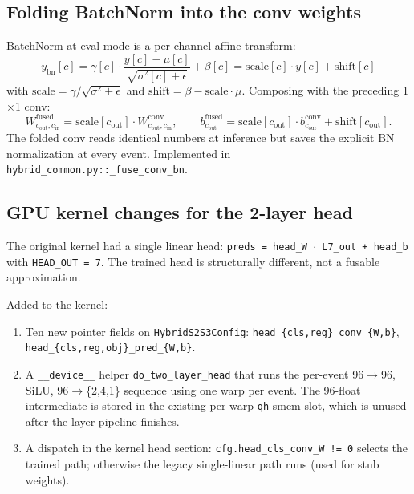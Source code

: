 \documentclass[11pt,a4paper]{article}
\begin{document}
\subsection{Folding BatchNorm into the conv weights}

BatchNorm at eval mode is a per-channel affine transform:
\[
y_{\text{bn}}[c] = \gamma[c] \cdot \frac{y[c] - \mu[c]}{\sqrt{\sigma^2[c] + \epsilon}} + \beta[c]
                  = \mathrm{scale}[c] \cdot y[c] + \mathrm{shift}[c]
\]
with $\mathrm{scale} = \gamma / \sqrt{\sigma^2 + \epsilon}$ and
$\mathrm{shift} = \beta - \mathrm{scale} \cdot \mu$. Composing with the
preceding 1$\times$1 conv:
\[
W^{\text{fused}}_{c_{\text{out}}, c_{\text{in}}} = \mathrm{scale}[c_{\text{out}}] \cdot W^{\text{conv}}_{c_{\text{out}}, c_{\text{in}}}, \qquad
b^{\text{fused}}_{c_{\text{out}}} = \mathrm{scale}[c_{\text{out}}] \cdot b^{\text{conv}}_{c_{\text{out}}} + \mathrm{shift}[c_{\text{out}}].
\]
The folded conv reads identical numbers at inference but saves
the explicit BN normalization at every event. Implemented in
\texttt{hybrid\_common.py::\_fuse\_conv\_bn}.

\subsection{GPU kernel changes for the 2-layer head}

The original kernel had a single linear head:
\texttt{preds = head\_W $\cdot$ L7\_out + head\_b} with
\texttt{HEAD\_OUT = 7}. The trained head is structurally different,
not a fusable approximation.

Added to the kernel:

\begin{enumerate}[itemsep=0pt]
  \item Ten new pointer fields on \texttt{HybridS2S3Config}:
        \texttt{head\_\{cls,reg\}\_conv\_\{W,b\}},
        \texttt{head\_\{cls,reg,obj\}\_pred\_\{W,b\}}.
  \item A \texttt{\_\_device\_\_} helper \texttt{do\_two\_layer\_head}
        that runs the per-event 96$\to$96, SiLU, 96$\to$\{2,4,1\}
        sequence using one warp per event. The 96-float intermediate
        is stored in the existing per-warp \texttt{qh} smem slot,
        which is unused after the layer pipeline finishes.
  \item A dispatch in the kernel head section:
        \texttt{cfg.head\_cls\_conv\_W != 0} selects the trained path;
        otherwise the legacy single-linear path runs (used for stub
        weights).
\end{enumerate}
\end{document}
